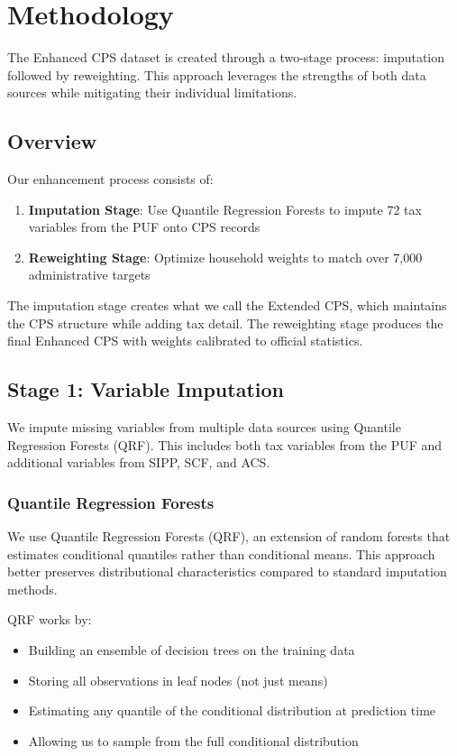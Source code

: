 \section{Methodology}

The Enhanced CPS dataset is created through a two-stage process: imputation followed by reweighting. This approach leverages the strengths of both data sources while mitigating their individual limitations.

\subsection{Overview}

Our enhancement process consists of:

\begin{enumerate}
\item \textbf{Imputation Stage}: Use Quantile Regression Forests to impute 72 tax variables from the PUF onto CPS records
\item \textbf{Reweighting Stage}: Optimize household weights to match over 7,000 administrative targets
\end{enumerate}

The imputation stage creates what we call the Extended CPS, which maintains the CPS structure while adding tax detail. The reweighting stage produces the final Enhanced CPS with weights calibrated to official statistics.

\subsection{Stage 1: Variable Imputation}

We impute missing variables from multiple data sources using Quantile Regression Forests (QRF). This includes both tax variables from the PUF and additional variables from SIPP, SCF, and ACS.

\subsubsection{Quantile Regression Forests}

We use Quantile Regression Forests (QRF), an extension of random forests that estimates conditional quantiles rather than conditional means. This approach better preserves distributional characteristics compared to standard imputation methods.

QRF works by:
\begin{itemize}
\item Building an ensemble of decision trees on the training data
\item Storing all observations in leaf nodes (not just means)
\item Estimating any quantile of the conditional distribution at prediction time
\item Allowing us to sample from the full conditional distribution
\end{itemize}

